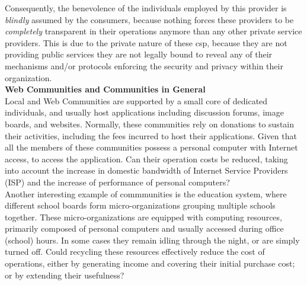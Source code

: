 \documentclass[12pt, titlepage]{uo_temp}
\begin{document}
     Consequently, the benevolence of the individuals employed by this provider is
     \emph{blindly} assumed by the consumers, because nothing forces these providers to be
     \emph{completely} transparent in their operations anymore than any other private
     service providers. This is due to the private nature of these \gls{csp}, because they
     are not providing public services they are not legally bound to reveal any of their
     mechanisms and/or protocols enforcing the security and privacy within their
     organization.\\

     \textbf{Web Communities and Communities in General}\\
     Local and Web Communities are supported by a small core of dedicated individuals, and
     usually host applications including discussion forums, image boards, and
     websites. Normally, these communities rely on donations to sustain their activities,
     including the fees incurred to host their applications. Given that all the members of
     these communities possess a personal computer with Internet access, to access the
     application. Can their operation costs be reduced, taking into account the increase
     in domestic bandwidth of Internet Service Providers (ISP) and the increase of
     performance of personal computers?
     \\

     Another interesting example of commmunities is the education system, where different
     school boards form micro-organizations grouping multiple schools together.  These
     micro-organizations are equipped with computing resources, primarily composed of
     personal computers and usually accessed during office (school) hours. In some cases
     they remain idling through the night, or are simply turned off. Could recycling these
     resources effectively reduce the cost of operations, either by generating income and
     covering their initial purchase cost; or by extending their usefulness?
     \\
\end{document}

